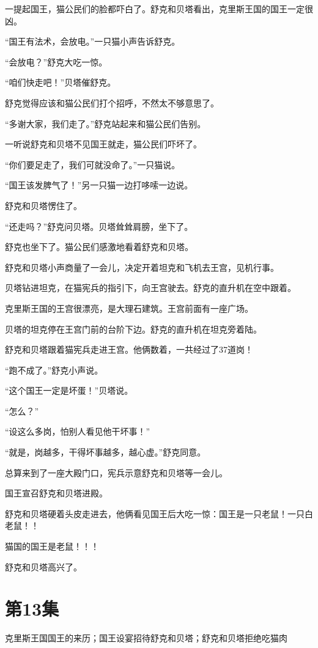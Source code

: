 \documentclass[a4paper,12pt,UTF8,twoside]{ctexbook}
\begin{document}
一提起国王，猫公民们的脸都吓白了。舒克和贝塔看出，克里斯王国的国王一定很凶。

“国王有法术，会放电。”一只猫小声告诉舒克。

“会放电？”舒克大吃一惊。

“咱们快走吧！”贝塔催舒克。

舒克觉得应该和猫公民们打个招呼，不然太不够意思了。

“多谢大家，我们走了。”舒克站起来和猫公民们告别。

一听说舒克和贝塔不见国王就走，猫公民们吓坏了。

“你们要足走了，我们可就没命了。”一只猫说。

“国王该发脾气了！”另一只猫一边打哆嗦一边说。

舒克和贝塔愣住了。

“还走吗？”舒克问贝塔。贝塔耸耸肩膀，坐下了。

舒克也坐下了。猫公民们感激地看着舒克和贝塔。

舒克和贝塔小声商量了一会儿，决定开着坦克和飞机去王宫，见机行事。

贝塔钻进坦克，在猫宪兵的指引下，向王宫驶去。舒克的直升机在空中跟着。

克里斯王国的王宫很漂亮，是大理石建筑。王宫前面有一座广场。

贝塔的坦克停在王宫门前的台阶下边。舒克的直升机在坦克旁着陆。

舒克和贝塔跟着猫宪兵走进王宫。他俩数着，一共经过了37道岗！

“跑不成了。”舒克小声说。

“这个国王一定是坏蛋！”贝塔说。

“怎么？”

“设这么多岗，怕别人看见他干坏事！”

“就是，岗越多，干得坏事越多，越心虚。”舒克同意。

总算来到了一座大殿门口，宪兵示意舒克和贝塔等一会儿。

国王宣召舒克和贝塔进殿。

舒克和贝塔硬着头皮走进去，他俩看见国王后大吃一惊：国王是一只老鼠！一只白老鼠！！

猫国的国王是老鼠！！！

舒克和贝塔高兴了。 

\chapter{第13集}

克里斯王国国王的来历；国王设宴招待舒克和贝塔；舒克和贝塔拒绝吃猫肉
\end{document}
